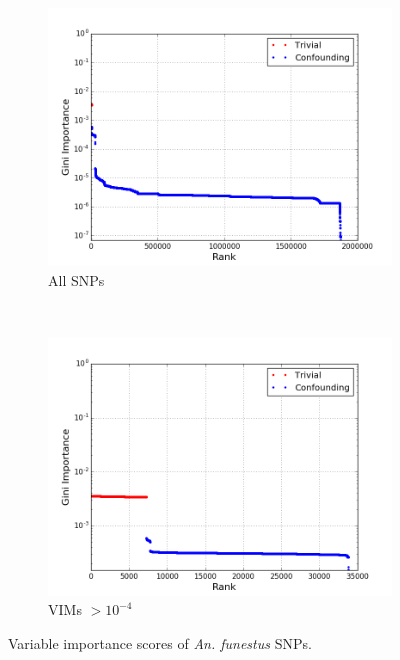 \begin{figure}[H]
  \centering
  \begin{subfigure}[b]{0.45\textwidth}
    \includegraphics[width=\textwidth]{figures/random_forests/funestus_ranks_10resamples_1000000trees_scores}
    \caption{All SNPs}
    \label{fig:funestus-all}
  \end{subfigure}
  ~
  \begin{subfigure}[b]{0.45\textwidth}
    \includegraphics[width=\textwidth]{figures/random_forests/funestus_ranks_10resamples_1000000trees_scores_subset}
    \caption{VIMs $> 10^{-4}$}
    \label{fig:funestus-thresholded}
  \end{subfigure}
  \caption{Variable importance scores of \emph{An. funestus} SNPs.}
  \label{fig:funestus}
\end{figure}
